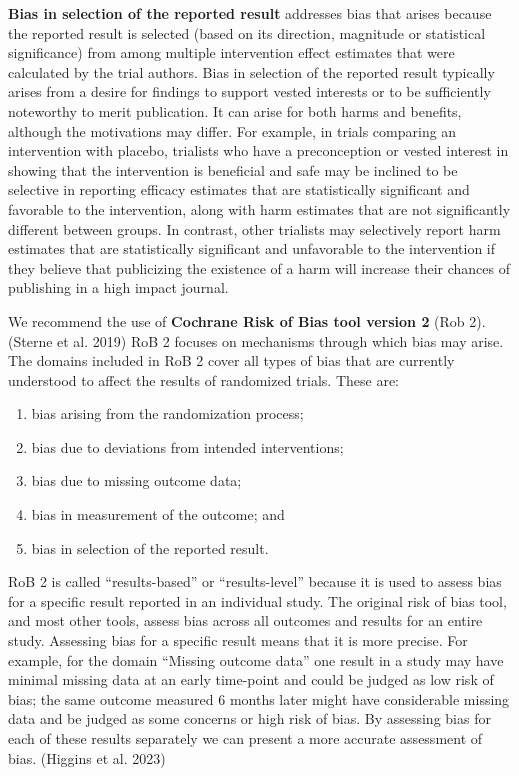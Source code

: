 \documentclass[
  11pt,
  a4paper,
  DIV=11,
  numbers=noendperiod]{scrreprt}
\begin{document}
\textbf{Bias in selection of the reported result} addresses bias that
arises because the reported result is selected (based on its direction,
magnitude or statistical significance) from among multiple intervention
effect estimates that were calculated by the trial authors. Bias in
selection of the reported result typically arises from a desire for
findings to support vested interests or to be sufficiently noteworthy to
merit publication. It can arise for both harms and benefits, although
the motivations may differ. For example, in trials comparing an
intervention with placebo, trialists who have a preconception or vested
interest in showing that the intervention is beneficial and safe may be
inclined to be selective in reporting efficacy estimates that are
statistically significant and favorable to the intervention, along with
harm estimates that are not significantly different between groups. In
contrast, other trialists may selectively report harm estimates that are
statistically significant and unfavorable to the intervention if they
believe that publicizing the existence of a harm will increase their
chances of publishing in a high impact journal.

We recommend the use of \textbf{Cochrane Risk of Bias tool version 2}
(Rob 2). (Sterne et al. 2019) RoB 2 focuses on mechanisms through which
bias may arise. The domains included in RoB 2 cover all types of bias
that are currently understood to affect the results of randomized
trials. These are:

\begin{enumerate}
\def\labelenumi{\arabic{enumi}.}
\item
  bias arising from the randomization process;
\item
  bias due to deviations from intended interventions;
\item
  bias due to missing outcome data;
\item
  bias in measurement of the outcome; and
\item
  bias in selection of the reported result.
\end{enumerate}

RoB 2 is called ``results-based'' or ``results-level'' because it is
used to assess bias for a specific result reported in an individual
study. The original risk of bias tool, and most other tools, assess bias
across all outcomes and results for an entire study. Assessing bias for
a specific result means that it is more precise. For example, for the
domain ``Missing outcome data'' one result in a study may have minimal
missing data at an early time-point and could be judged as low risk of
bias; the same outcome measured 6 months later might have considerable
missing data and be judged as some concerns or high risk of bias. By
assessing bias for each of these results separately we can present a
more accurate assessment of bias. (Higgins et al. 2023)
\end{document}
